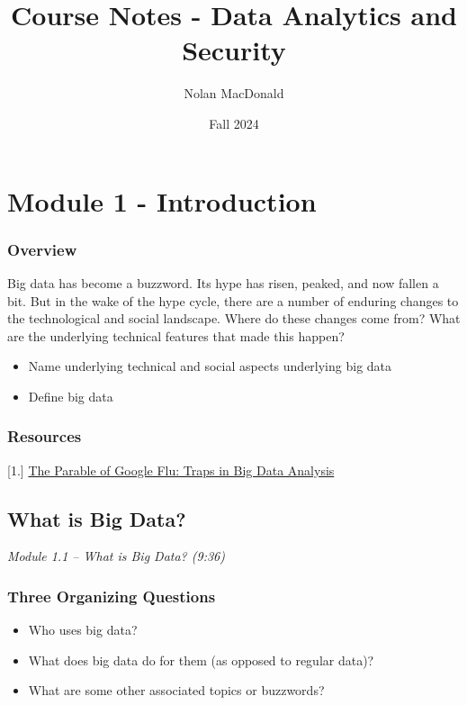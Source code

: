 \documentclass[
]{book}
\title{Course Notes - Data Analytics and Security}
\author{Nolan MacDonald}
\date{Fall 2024}
\providecommand{\tightlist}{%
  \setlength{\itemsep}{0pt}\setlength{\parskip}{0pt}}
\begin{document}
\maketitle

{
\setcounter{tocdepth}{1}
\tableofcontents
}
\chapter{Module 1 - Introduction}\label{module-1---introduction}

\subsection{Overview}\label{overview}

Big data has become a buzzword. Its hype has risen, peaked, and now fallen a bit. But in the wake of the hype cycle, there are a number of enduring changes to the technological and social landscape. Where do these changes come from? What are the underlying technical features that made this happen?

\begin{itemize}
\tightlist
\item
  Name underlying technical and social aspects underlying big data
\item
  Define big data
\end{itemize}

\subsection{Resources}\label{resources}

{[}1.{]} \href{https://gking.harvard.edu/files/gking/files/0314policyforumff.pdf}{The Parable of Google Flu: Traps in Big Data Analysis}

\section{What is Big Data?}\label{what-is-big-data}

\emph{Module 1.1 -- What is Big Data? (9:36)}

\subsection{Three Organizing Questions}\label{three-organizing-questions}

\begin{itemize}
\tightlist
\item
  Who uses big data?
\item
  What does big data do for them (as opposed to regular data)?
\item
  What are some other associated topics or buzzwords?
\end{itemize}
\end{document}
